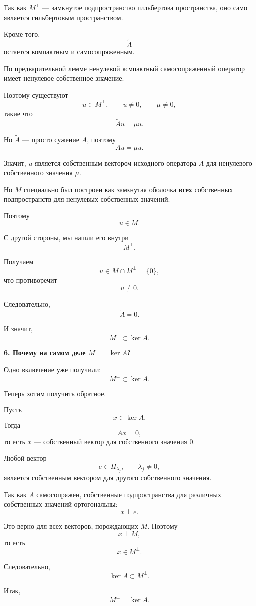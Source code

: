 \begin{idea}
	Так как \(M^\perp\) --- замкнутое подпространство гильбертова пространства,
	оно само является гильбертовым пространством.
	
	Кроме того,
	\[
	\widetilde A
	\]
	остается компактным и самосопряженным.
	
	По предварительной лемме ненулевой компактный самосопряженный оператор
	имеет ненулевое собственное значение.
	
	Поэтому существуют
	\[
	u\in M^\perp,
	\qquad
	u\neq0,
	\qquad
	\mu\neq0,
	\]
	такие что
	\[
	\widetilde Au=\mu u.
	\]
	
	Но \(\widetilde A\) --- просто сужение \(A\), поэтому
	\[
	Au=\mu u.
	\]
	
	Значит, \(u\) является собственным вектором исходного оператора \(A\)
	для ненулевого собственного значения \(\mu\).
	
	Но \(M\) специально был построен как замкнутая оболочка
	\textbf{всех} собственных подпространств для ненулевых собственных значений.
	
	Поэтому
	\[
	u\in M.
	\]
	
	С другой стороны, мы нашли его внутри
	\[
	M^\perp.
	\]
	
	Получаем
	\[
	u\in M\cap M^\perp=\{0\},
	\]
	что противоречит
	\[
	u\neq0.
	\]
	
	Следовательно,
	\[
	\boxed{\widetilde A=0.}
	\]
	
	И значит,
	\[
	\boxed{M^\perp\subset\ker A.}
	\]
	
	\medskip
	
	\textbf{6. Почему на самом деле \(M^\perp=\ker A\)?}
	
	Одно включение уже получили:
	\[
	M^\perp\subset\ker A.
	\]
	
	Теперь хотим получить обратное.
	
	Пусть
	\[
	x\in\ker A.
	\]
	Тогда
	\[
	Ax=0,
	\]
	то есть \(x\) --- собственный вектор для собственного значения \(0\).
	
	Любой вектор
	\[
	e\in H_{\lambda_j},
	\qquad
	\lambda_j\neq0,
	\]
	является собственным вектором для другого собственного значения.
	
	Так как \(A\) самосопряжен, собственные подпространства для различных
	собственных значений ортогональны:
	\[
	x\perp e.
	\]
	
	Это верно для всех векторов, порождающих \(M\). Поэтому
	\[
	x\perp M,
	\]
	то есть
	\[
	x\in M^\perp.
	\]
	
	Следовательно,
	\[
	\ker A\subset M^\perp.
	\]
	
	Итак,
	\[
	\boxed{
		M^\perp=\ker A.
	}
	\]
	

\end{idea}
